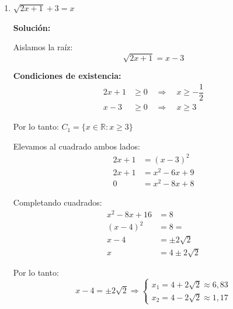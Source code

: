 \documentclass[12pt]{article}
\newcommand{\solucion}{%
    \vspace{0.8em}%
    \textbf{Solución:}%
}
\begin{document}
\begin{enumerate}[label=\alph*.-]
    Por lo tanto:
    \[
    \dfrac{-19 \pm 5}{6} \Rightarrow \begin{cases} x_1 = \dfrac{-19 + 5}{6} = -\dfrac{7}{3} \\[0.5em] x_2 = \dfrac{-19 - 5}{6} = -4 \end{cases}
    \]

    \textbf{Verificación del dominio:}
    \begin{itemize}
        \item $x_1 = -\dfrac{7}{3} \neq -\dfrac{7}{2}, -3$ \checkmark \ \ Pertenece al dominio
        \item $x_2 = -4 \neq -\dfrac{7}{2}, -3$ \checkmark \ \ Pertenece al dominio
    \end{itemize}

    \[
    \boxed{CS = \left\{-\dfrac{7}{3},\ -4\right\}}
    \]

    \item $\sqrt{2x+1} + 3 = x$

    \solucion

    Aislamos la raíz:
    \[
    \sqrt{2x+1} = x - 3
    \]

    \textbf{Condiciones de existencia:}
    \begin{align*}
    2x + 1 &\geq 0 \quad \Rightarrow \quad x \geq -\dfrac{1}{2} \\
    x - 3 &\geq 0 \quad \Rightarrow \quad x \geq 3
    \end{align*}

    Por lo tanto: $C_1 = \{x \in \mathbb{R} : x \geq 3\}$

    Elevamos al cuadrado ambos lados:
    \begin{align*}
    2x + 1 &= (x-3)^2 \\[0.3em]
    2x + 1 &= x^2 - 6x + 9 \\[0.3em]
    0 &= x^2 - 8x + 8
    \end{align*}

    Completando cuadrados:
    \begin{align*}
    x^2 - 8x + 16 &= 8 \\[0.3em]
    (x-4)^2 &= 8 = \\[0.3em]
    x - 4 &= \pm 2\sqrt{2} \\[0.3em]
    x &= 4 \pm 2\sqrt{2}
    \end{align*}

    Por lo tanto:
    \[
    x - 4 = \pm 2\sqrt{2} \Rightarrow \begin{cases} x_1 = 4 + 2\sqrt{2} \approx 6{,}83 \\ x_2 = 4 - 2\sqrt{2} \approx 1{,}17 \end{cases}
    \]


\end{enumerate}
\end{document}
